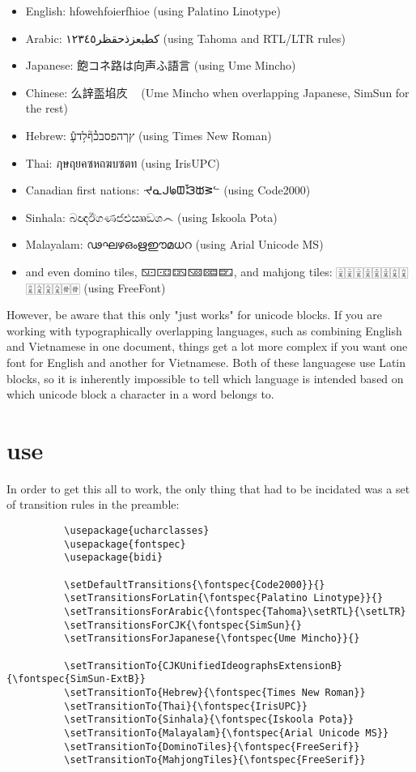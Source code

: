 \documentclass{article}
\newenvironment{itemlist}{%
  \begin{itemize}
	\setlength{\itemsep}{0pt}
	\setlength{\parsep}{0pt}
	\setlength{\topsep}{0pt}
	\setlength{\partopsep}{0pt}
	\setlength{\parskip}{0pt}
	\setlength{\labelsep}{5pt}}%
{
  \end{itemize}}
\begin{document}
		\begin{itemlist}
			\item English: hfowehfoierfhioe (using Palatino Linotype)
			\item Arabic: كطبعزذحقظر١٢٣٤٥ (using Tahoma and RTL/LTR rules)
			\item Japanese: 飽コネ路は向声ふ語言 (using Ume Mincho)
			\item Chinese: 么䛨䀃埳㡱𠁽𠔾𠣓 (Ume Mincho when overlapping Japanese, SimSun for the rest)
			\item Hebrew: ץךהפסבכ֨֓ף֘ל֥דע֤֕ (using Times New Roman)
			\item Thai: ฦษฤยคซหถฆบซตท (using IrisUPC)
			\item Canadian first nations: ᔵᓇᒍᖚᗵᘼᙔᕒᓪ (using Code2000)
			\item Sinhala: බඥඊගණජඑඎඞශ෴ (using Iskoola Pota)
			\item Malayalam: ഢഘഴഒംഋഈമധറ (using Arial Unicode MS)
			\item and even domino tiles, 🁇🀼🁐🁋🁚🁝, and mahjong tiles: 🀈🀈🀈🀉🀉🀉🀌🀌🀌🀎🀎🀎🀅🀅 (using FreeFont)
		\end{itemlist}

		However, be aware that this only "just works" for unicode blocks. If you are working with typographically overlapping languages, such as combining English and Vietnamese in one document, things get a lot more complex if you want one font for English and another for Vietnamese. Both of these languagese use Latin blocks, so it is inherently impossible to tell which language is intended based on which unicode block a character in a word belongs to.
		
	\section{use}

		In order to get this all to work, the only thing that had to be incidated was a set of transition rules in the preamble:
		
		\disableTransitionRules
		\begin{verbatim}
　　　　　　\usepackage{ucharclasses}
　　　　　　\usepackage{fontspec}
　　　　　　\usepackage{bidi}

　　　　　　\setDefaultTransitions{\fontspec{Code2000}}{}
　　　　　　\setTransitionsForLatin{\fontspec{Palatino Linotype}}{}
　　　　　　\setTransitionsForArabic{\fontspec{Tahoma}\setRTL}{\setLTR}
　　　　　　\setTransitionsForCJK{\fontspec{SimSun}{}
　　　　　　\setTransitionsForJapanese{\fontspec{Ume Mincho}}{}

　　　　　　\setTransitionTo{CJKUnifiedIdeographsExtensionB}{\fontspec{SimSun-ExtB}}
　　　　　　\setTransitionTo{Hebrew}{\fontspec{Times New Roman}}
　　　　　　\setTransitionTo{Thai}{\fontspec{IrisUPC}}
　　　　　　\setTransitionTo{Sinhala}{\fontspec{Iskoola Pota}}
　　　　　　\setTransitionTo{Malayalam}{\fontspec{Arial Unicode MS}}
　　　　　　\setTransitionTo{DominoTiles}{\fontspec{FreeSerif}}
　　　　　　\setTransitionTo{MahjongTiles}{\fontspec{FreeSerif}}
		\end{verbatim}
		\enableTransitionRules
\end{document}
